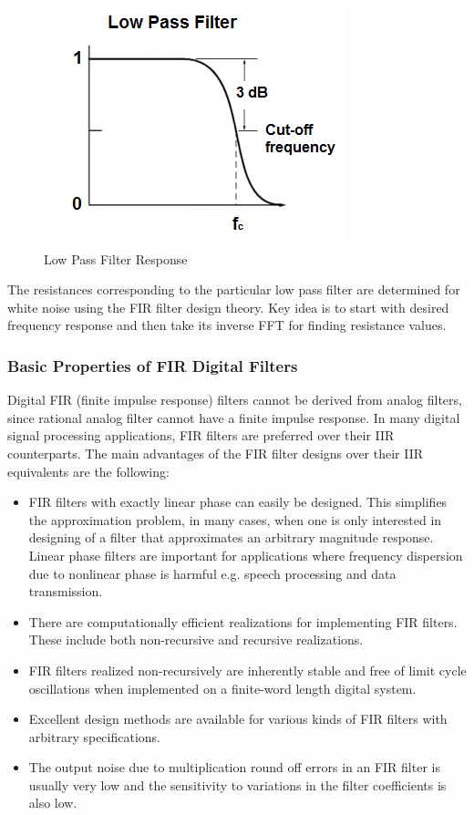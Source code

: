 \documentclass[a4paper,12pt]{article}
\begin{document}
   \begin{figure}[!ht]
   	\centering
   	\includegraphics[scale=0.8]{lp_filter}
   	\caption{Low Pass Filter Response}
   	\label{fig:lp}
   \end{figure}
   The resistances corresponding to the particular low pass filter are determined for white noise using the FIR filter design theory. Key idea is to start with desired frequency response and then take its inverse FFT for finding resistance values.
   
\subsubsection{Basic Properties of FIR Digital Filters}
   Digital FIR (finite impulse response) filters cannot be derived from analog filters, since rational analog filter cannot have a finite impulse response. In many digital signal processing applications, FIR filters are preferred over their IIR counterparts. The main advantages of the FIR filter designs over their IIR equivalents are the following:
   \begin{itemize}
   	\item FIR filters with exactly linear phase can easily be designed. This simplifies the approximation problem, in many cases, when one is only interested in designing of a filter that approximates an arbitrary magnitude response. Linear phase filters are important for applications where frequency dispersion due to nonlinear phase is harmful e.g. speech processing and data transmission.
   	\item There are computationally efficient realizations for implementing FIR filters. These include both non-recursive and recursive realizations.
   	\item FIR filters realized non-recursively are inherently stable and free of limit cycle oscillations when implemented on a finite-word length digital system.
   	\item Excellent design methods are available for various kinds of FIR filters with arbitrary specifications.
   	\item The output noise due to multiplication round off errors in an FIR filter is usually very low and the sensitivity to variations in the filter coefficients is also low. 
   \end{itemize}
\end{document}
